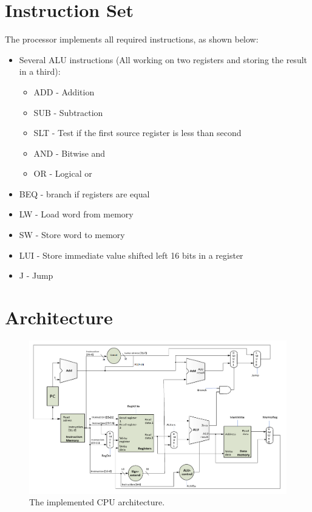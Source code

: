 \section{Instruction Set}

The processor implements all required instructions, as shown below:

\begin{itemize} \item Several ALU instructions (All working on two registers and
storing the result in a third): \begin{itemize} \item ADD - Addition \item SUB -
Subtraction \item SLT - Test if the first source register is less than second
\item AND - Bitwise and \item OR  - Logical or \end{itemize} \item BEQ - branch
if registers are equal \item LW - Load word from memory \item SW - Store word to
memory \item LUI - Store immediate value shifted left 16 bits in a register
\item J - Jump \end{itemize}

\section{Architecture}

\begin{figure}[ht] \centering \includegraphics[scale=0.3]{figures/cpu.png}
\caption{\label{fig:cpuArchitecture}The implemented CPU architecture.}
\end{figure}

